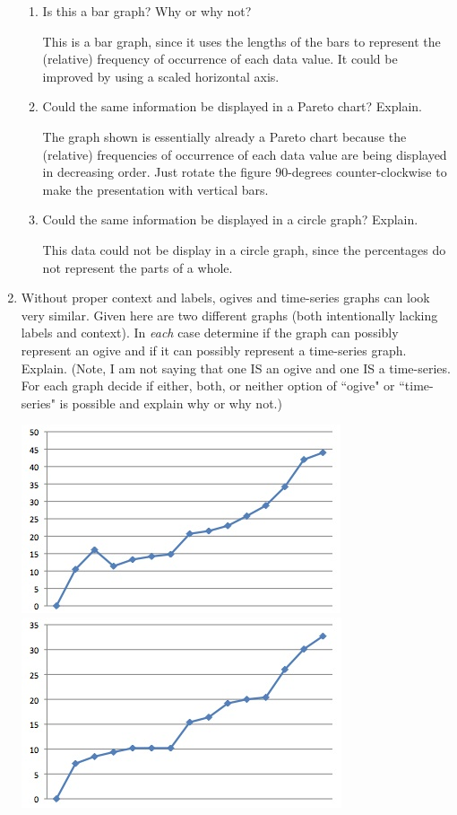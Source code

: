 \documentclass{article}
\newcommand{\answer}[1]{\color{white}#1}
\begin{document}
\begin{enumerate}
	\begin{enumerate}
	\item Is this a bar graph?  Why or why not? 
	
	{\answer{This is a bar graph, since it uses the lengths of the bars to represent the (relative) frequency of occurrence of each data value.  It could be improved by using a scaled horizontal axis.}} 
	
	\item Could the same information be displayed in a Pareto chart?  Explain.
	
	{\answer{The graph shown is essentially already a Pareto chart because the (relative) frequencies of occurrence of each data value are being displayed in decreasing order.  Just rotate the figure 90-degrees counter-clockwise to make the presentation with vertical bars.}} 
	
	\item Could the same information be displayed in a circle graph?  Explain.
	
	{\answer{This data could not be display in a circle graph, since the percentages do not represent the parts of a whole.}}
	
	\end{enumerate}
	
\newpage
	
\item Without proper context and labels, ogives and time-series graphs can look very similar.  Given here are two different graphs (both intentionally lacking labels and context).  In {\em each} case determine if the graph can possibly represent an ogive and if it can possibly represent a time-series graph.  Explain.  
(Note, I am not saying that one IS an ogive and one IS a time-series.  For each graph decide if either, both, or neither option of ``ogive" or ``time-series" is possible and explain why or why not.)

\includegraphics[scale=0.4]{WS2_Time.jpg} \hspace{4cm}
\includegraphics[scale=0.4]{WS2_Ogive.jpg}


\end{enumerate}
\end{document}

